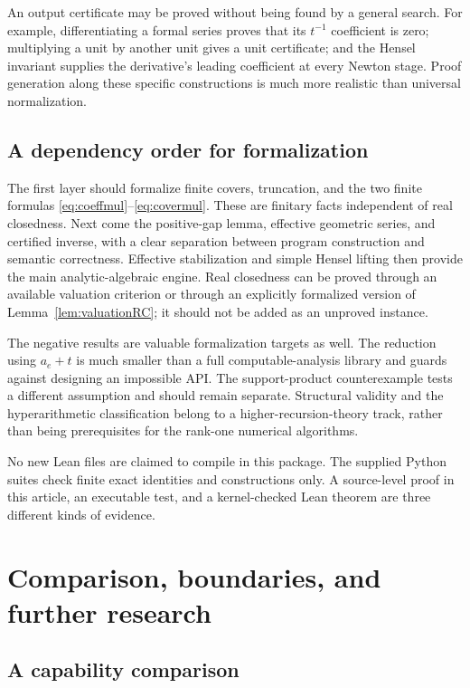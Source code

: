 \documentclass[11pt,letterpaper]{article}
\numberwithin{equation}{section}
\theoremstyle{definition}
\theoremstyle{remark}
\begin{document}
An output certificate may be proved without being found by a general
search. For example, differentiating a formal series proves that its
$t^{-1}$ coefficient is zero; multiplying a unit by another unit gives a
unit certificate; and the Hensel invariant supplies the derivative's
leading coefficient at every Newton stage. Proof generation along these
specific constructions is much more realistic than universal
normalization.

\subsection{A dependency order for formalization}

The first layer should formalize finite covers, truncation, and the two
finite formulas \eqref{eq:coeffmul}--\eqref{eq:covermul}. These are
finitary facts independent of real closedness. Next come the positive-gap
lemma, effective geometric series, and certified inverse, with a clear
separation between program construction and semantic correctness.
Effective stabilization and simple Hensel lifting then provide the main
analytic-algebraic engine. Real closedness can be proved through an
available valuation criterion or through an explicitly formalized version
of Lemma~\ref{lem:valuationRC}; it should not be added as an unproved
instance.

The negative results are valuable formalization targets as well. The
reduction using $a_e+t$ is much smaller than a full computable-analysis
library and guards against designing an impossible API. The support-product
counterexample tests a different assumption and should remain separate.
Structural validity and the hyperarithmetic classification belong to a
higher-recursion-theory track, rather than being prerequisites for the
rank-one numerical algorithms.

No new Lean files are claimed to compile in this package. The supplied
Python suites check finite exact identities and constructions only.
A source-level proof in this article, an executable test, and a kernel-checked
Lean theorem are three different kinds of evidence.

\section{Comparison, boundaries, and further research}
\label{sec:outlook}

\subsection{A capability comparison}
\end{document}
